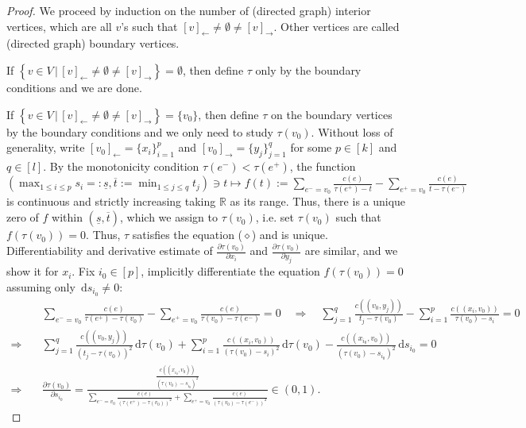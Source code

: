 \documentclass[fleqn]{article}
\theoremstyle{definition}
\theoremstyle{remark}
\renewcommand{\d}{\,\mathrm{d}} %
\begin{document}
\begin{proof}
We proceed by induction on the number of (directed graph) interior vertices, which are all $v$'s such that $[v]_\leftarrow \ne \emptyset \ne [v]_\rightarrow$. Other vertices are called (directed graph) boundary vertices.
\par
If $\left\{v\in V \,\big|\, [v]_\leftarrow \ne \emptyset \ne [v]_\rightarrow \right\} = \emptyset$, then define $\tau$ only by the boundary conditions and we are done.
\par
If $\left\{v\in V \,\big|\, [v]_\leftarrow \ne \emptyset \ne [v]_\rightarrow \right\} = \{v_0\}$, then define $\tau$ on the boundary vertices by the boundary conditions and we only need to study $\tau(v_0)$. Without loss of generality, write $[v_0]_\leftarrow=\{x_i\}_{i=1}^p$ and $[v_0]_\rightarrow=\{y_j\}_{j=1}^q$ for some $p\in[k]$ and $q\in[l]$. By the monotonicity condition $\tau(e^-)<\tau(e^+)$, the function $\left(\max_{1\le i\le p} s_i =:\underline{s},\overline{t}:=\min_{1\le j\le q} t_j \right) \ni t\mapsto f(t):=\sum_{e^- =v_0}\frac{c(e)}{\tau(e^+)-t} - \sum_{e^+ =v_0}\frac{c(e)}{t-\tau(e^-)}$ is continuous and strictly increasing taking $\mathbb{R}$ as its range. Thus, there is a unique zero of $f$ within $(\underline{s},\overline{t})$, which we assign to $\tau(v_0)$, i.e. set $\tau(v_0)$ such that $f\left(\tau(v_0)\right)=0$. Thus, $\tau$ satisfies the equation ($\diamond$) and is unique. Differentiability and derivative estimate of $\frac{\partial \tau(v_0)}{\partial x_i}$ and $\frac{\partial \tau(v_0)}{\partial y_j}$ are similar, and we show it for $x_i$. Fix $i_0\in[p]$, implicitly differentiate the equation $f(\tau(v_0))=0$ assuming only $\d s_{i_0} \ne 0$:
\begin{align*}
& \sum_{e^- =v_0}\frac{c(e)}{\tau(e^+)-\tau(v_0)} - \sum_{e^+ =v_0}\frac{c(e)}{\tau(v_0)-\tau(e^-)} =0 \quad
\Rightarrow \quad \sum_{j=1}^q \frac{c((v_0,y_j))}{t_j-\tau(v_0)} - \sum_{i=1}^p \frac{c((x_i,v_0))}{\tau(v_0)-s_i} =0 \\
\Rightarrow \quad & \sum_{j=1}^q \frac{c((v_0,y_j))}{\left(t_j-\tau(v_0)\right)^2} \d\tau(v_0) + \sum_{i=1}^p \frac{c((x_i,v_0))}{\left(\tau(v_0)-s_i\right)^2} \d\tau(v_0) - \frac{c((x_{i_0},v_0))}{\left(\tau(v_0)-s_{i_0}\right)^2} \d s_{i_0} =0 \\
\Rightarrow \quad & \frac{\partial \tau(v_0)}{\partial s_{i_0}} = \frac{\frac{c((x_{i_0},v_0))}{\left(\tau(v_0)-s_{i_0}\right)^2}}{\sum_{e^-=v_0}\frac{c(e)}{\left(\tau(e^+)-\tau(v_0)\right)^2} + \sum_{e^+=v_0} \frac{c(e)}{\left(\tau(v_0)-\tau(e^-)\right)^2}} \in (0,1).

\end{align*}
\end{proof}
\end{document}
